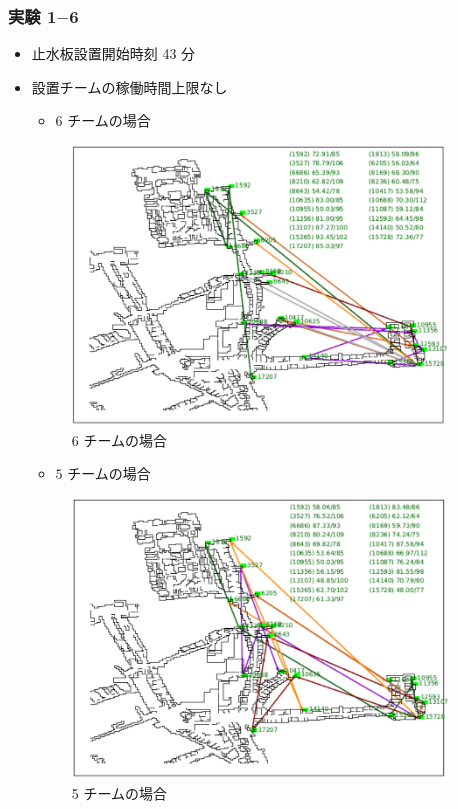 \documentclass[a4paper,12pt,fleqn]{jarticle}
\begin{document}
\subsubsection{実験 1$-$6}
\begin{itemize}
\item 止水板設置開始時刻 43 分
\item 設置チームの稼働時間上限なし


\begin{itemize}
\item 6 チームの場合\\
\end{itemize}

\begin{figure}[H]
\begin{center}
  \includegraphics[width=10cm,clip]{st43_t6_no30.pdf}
  \caption{6 チームの場合}
  \label{fig:st43_t6_no30}
  \end{center}
\end{figure}

\begin{itemize}
\item $5$ チームの場合\\
\end{itemize}

\begin{figure}[H]
\begin{center}
  \includegraphics[width=10cm,clip]{st43_t5_no30.pdf}
  \caption{5 チームの場合}
  \label{fig:st43_t5_no30}
  \end{center}
\end{figure}



\end{itemize}
\end{document}
